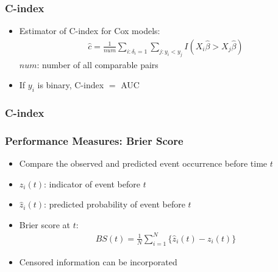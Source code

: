 \documentclass[14pt]{beamer}
\begin{document}
	\begin{frame}
	\frametitle{C-index}
	\begin{itemize}
	\item Estimator of C-index for Cox models:
	\begin{eqnarray*}
	\hat{c} = \frac{1}{num} \sum_{i:\delta_i = 1} \sum_{j:y_i < y_j} I(X_i \hat{\beta} > X_j \hat{\beta})
	\end{eqnarray*}
	$num$: number of all comparable pairs
	\item If $y_i$ is binary, C-index $=$ AUC

	\end{itemize}

	\end{frame}

	\begin{frame}
	\frametitle{C-index}
	\end{frame}

	\begin{frame}
	\frametitle{Performance Measures: Brier Score}
	\begin{itemize}
	\item Compare the observed and predicted event occurrence before time $t$
	\item $z_i(t)$: indicator of event before $t$
	\item $\hat{z}_i(t)$: predicted probability of event before $t$
	\item Brier score at $t$:
	\begin{eqnarray*}
	BS(t) = \frac{1}{N} \sum_{i=1}^N \{\hat{z}_i(t) - z_i(t) \}
	\end{eqnarray*}
	\item Censored information can be incorporated

	\end{itemize}

	\end{frame}
\end{document}
